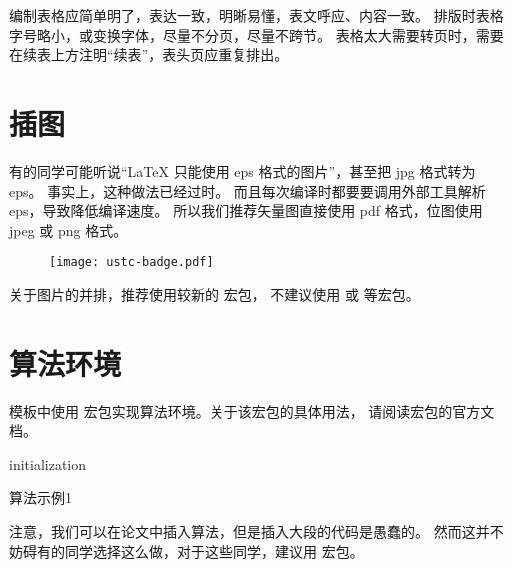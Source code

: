 编制表格应简单明了，表达一致，明晰易懂，表文呼应、内容一致。
排版时表格字号略小，或变换字体，尽量不分页，尽量不跨节。
表格太大需要转页时，需要在续表上方注明“续表”，表头页应重复排出。



\section{插图}

有的同学可能听说“\LaTeX{} 只能使用 eps 格式的图片”，甚至把 jpg 格式转为 eps。
事实上，这种做法已经过时。
而且每次编译时都要要调用外部工具解析 eps，导致降低编译速度。
所以我们推荐矢量图直接使用 pdf 格式，位图使用 jpeg 或 png 格式。

\begin{figure}[ht]
  \centering
  \texttt{[image: ustc-badge.pdf]}
  \label{fig:badge}
\end{figure}

关于图片的并排，推荐使用较新的  宏包，
不建议使用  或  等宏包。



\section{算法环境}

模板中使用  宏包实现算法环境。关于该宏包的具体用法，
请阅读宏包的官方文档。

\begin{algorithm}
  \SetAlgoLined

  initialization\;
  \caption{算法示例1}
  \label{algo:algorithm1}
\end{algorithm}

注意，我们可以在论文中插入算法，但是插入大段的代码是愚蠢的。
然而这并不妨碍有的同学选择这么做，对于这些同学，建议用  宏包。
